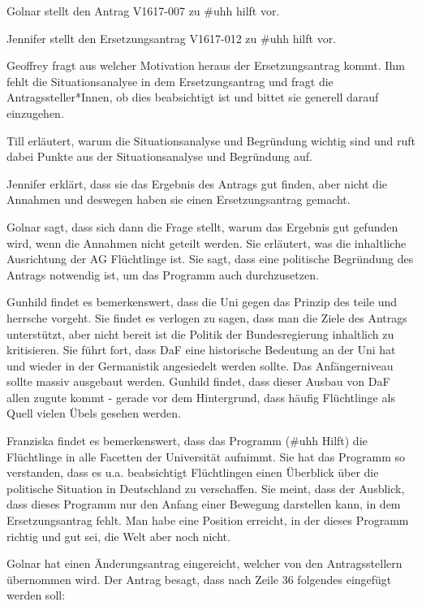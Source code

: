 \documentclass[ngerman,headheight=70pt]{scrartcl}
\begin{document}
    Golnar stellt den Antrag V1617-007 zu \#uhh hilft vor.

    Jennifer stellt den Ersetzungsantrag V1617-012 zu \#uhh hilft vor.

    Geoffrey fragt aus welcher Motivation heraus der Ersetzungsantrag kommt.
    Ihm fehlt die Situationsanalyse in dem Ersetzungsantrag und fragt die
    Antragssteller*Innen, ob dies beabsichtigt ist und bittet sie generell
    darauf einzugehen.

    Till erläutert, warum die Situationsanalyse und Begründung wichtig sind und
    ruft dabei Punkte aus der Situationsanalyse und Begründung auf.

    Jennifer erklärt, dass sie das Ergebnis des Antrags gut finden, aber nicht
    die Annahmen und deswegen haben sie einen Ersetzungsantrag gemacht.

    Golnar sagt, dass sich dann die Frage stellt, warum das Ergebnis gut gefunden
    wird, wenn die Annahmen nicht geteilt werden. Sie erläutert, was die inhaltliche
    Ausrichtung der AG Flüchtlinge ist. Sie sagt, dass eine politische Begründung
    des Antrags notwendig ist, um das Programm auch durchzusetzen.

    Gunhild findet es bemerkenswert, dass die Uni gegen das Prinzip des teile
    und herrsche vorgeht. Sie findet es verlogen zu sagen, dass man die Ziele
    des Antrags unterstützt, aber nicht bereit ist die Politik der Bundesregierung
    inhaltlich zu kritisieren. Sie führt fort, dass DaF eine historische Bedeutung
    an der Uni hat und wieder in der Germanistik angesiedelt werden sollte.
    Das Anfängerniveau sollte massiv ausgebaut werden. Gunhild findet, dass dieser
    Ausbau von DaF allen zugute kommt - gerade vor dem Hintergrund, dass häufig
    Flüchtlinge als Quell vielen Übels gesehen werden.

    Franziska findet es bemerkenswert, dass das Programm (\#uhh Hilft) die Flüchtlinge
    in alle Facetten der Universität aufnimmt. Sie hat das Programm so verstanden,
    dass es u.a. beabsichtigt Flüchtlingen einen Überblick über die politische
    Situation in Deutschland zu verschaffen. Sie meint, dass der Ausblick, dass dieses
    Programm nur den Anfang einer Bewegung darstellen kann, in dem Ersetzungsantrag
    fehlt. Man habe eine Position erreicht, in der dieses Programm richtig und gut
    sei, die Welt aber noch nicht.

    Golnar hat einen Änderungsantrag eingereicht, welcher von den Antragsstellern
    übernommen wird. Der Antrag besagt, dass nach Zeile 36 folgendes eingefügt
    werden soll:
\end{document}
